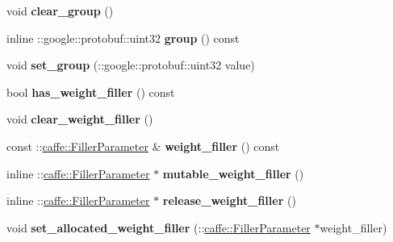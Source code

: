 \begin{DoxyCompactItemize}
void {\bfseries clear\+\_\+group} ()
\item 
\mbox{\label{classcaffe_1_1_convolution_parameter_a9f93d2fd15b5c7155f14cab403f3a323}} 
inline \+::google\+::protobuf\+::uint32 {\bfseries group} () const
\item 
\mbox{\label{classcaffe_1_1_convolution_parameter_af4e1c10369d4355de07e1f6f1283b572}} 
void {\bfseries set\+\_\+group} (\+::google\+::protobuf\+::uint32 value)
\item 
\mbox{\label{classcaffe_1_1_convolution_parameter_a682539a12157a67f6bebdedb99a78f3c}} 
bool {\bfseries has\+\_\+weight\+\_\+filler} () const
\item 
\mbox{\label{classcaffe_1_1_convolution_parameter_abb6ddd02f35c8c51118cc3dac67b9935}} 
void {\bfseries clear\+\_\+weight\+\_\+filler} ()
\item 
\mbox{\label{classcaffe_1_1_convolution_parameter_ade339fe92fba56ccc29bbc24b80ea420}} 
const \+::\mbox{\hyperlink{classcaffe_1_1_filler_parameter}{caffe\+::\+Filler\+Parameter}} \& {\bfseries weight\+\_\+filler} () const
\item 
\mbox{\label{classcaffe_1_1_convolution_parameter_a1502279e5e76f17c0b5dc40bc1ea2952}} 
inline \+::\mbox{\hyperlink{classcaffe_1_1_filler_parameter}{caffe\+::\+Filler\+Parameter}} $\ast$ {\bfseries mutable\+\_\+weight\+\_\+filler} ()
\item 
\mbox{\label{classcaffe_1_1_convolution_parameter_a396a252529281d7a9a24dbbade075ad3}} 
inline \+::\mbox{\hyperlink{classcaffe_1_1_filler_parameter}{caffe\+::\+Filler\+Parameter}} $\ast$ {\bfseries release\+\_\+weight\+\_\+filler} ()
\item 
\mbox{\label{classcaffe_1_1_convolution_parameter_aa85d58a9ca79b2e82b5bd5c7fce51992}} 
void {\bfseries set\+\_\+allocated\+\_\+weight\+\_\+filler} (\+::\mbox{\hyperlink{classcaffe_1_1_filler_parameter}{caffe\+::\+Filler\+Parameter}} $\ast$weight\+\_\+filler)

\end{DoxyCompactItemize}
